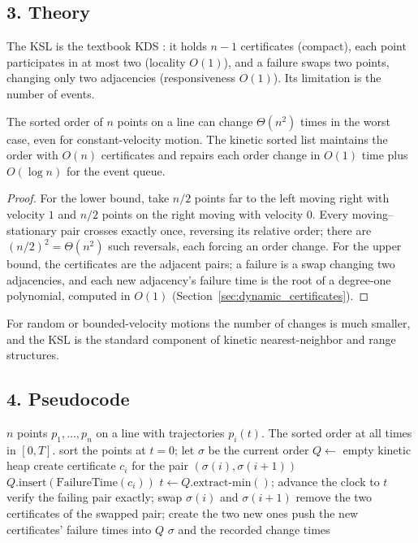 \subsection{3. Theory}

The KSL is the textbook KDS \cite{basch1999}: it holds $n-1$ certificates
(compact), each point participates in at most two (locality $O(1)$), and a
failure swaps two points, changing only two adjacencies (responsiveness
$O(1)$). Its limitation is the number of events.

\begin{theorem}\label{thm:kinetic_sort_events}
  The sorted order of $n$ points on a line can change $\Theta(n^2)$ times in
  the worst case, even for constant-velocity motion. The kinetic sorted list
  maintains the order with $O(n)$ certificates and repairs each order change
  in $O(1)$ time plus $O(\log n)$ for the event queue.
\end{theorem}

\begin{proof}
  For the lower bound, take $n/2$ points far to the left moving right with
  velocity $1$ and $n/2$ points on the right moving with velocity $0$. Every
  moving--stationary pair crosses exactly once, reversing its relative order;
  there are $(n/2)^2 = \Theta(n^2)$ such reversals, each forcing an order
  change. For the upper bound, the certificates are the adjacent pairs; a
  failure is a swap changing two adjacencies, and each new adjacency's
  failure time is the root of a degree-one polynomial, computed in $O(1)$
  (Section~\ref{sec:dynamic_certificates}).
\end{proof}

For random or bounded-velocity motions the number of changes is much
smaller, and the KSL is the standard component of kinetic nearest-neighbor
and range structures.

\subsection{4. Pseudocode}

\begin{algorithm}[htbp]
\caption{Kinetic Sorted List}
\label{alg:kinetic_sort}
\begin{algorithmic}[1]
\Require $n$ points $p_1, \dots, p_n$ on a line with trajectories $p_i(t)$.
\Ensure The sorted order at all times in $[0, T]$.
  \State sort the points at $t = 0$; let $\sigma$ be the current order
  \State $Q \gets$ empty kinetic heap
    \State create certificate $c_i$ for the pair $(\sigma(i), \sigma(i+1))$
    \State $Q.\text{insert}(\text{FailureTime}(c_i))$
  \EndFor
    \State $t \gets Q.\text{extract-min}()$; advance the clock to $t$
    \State verify the failing pair exactly; swap $\sigma(i)$ and $\sigma(i+1)$
    \State remove the two certificates of the swapped pair; create the two new ones
    \State push the new certificates' failure times into $Q$
  \EndWhile
  \State \Return $\sigma$ and the recorded change times
\EndFunction
\end{algorithmic}
\end{algorithm}


